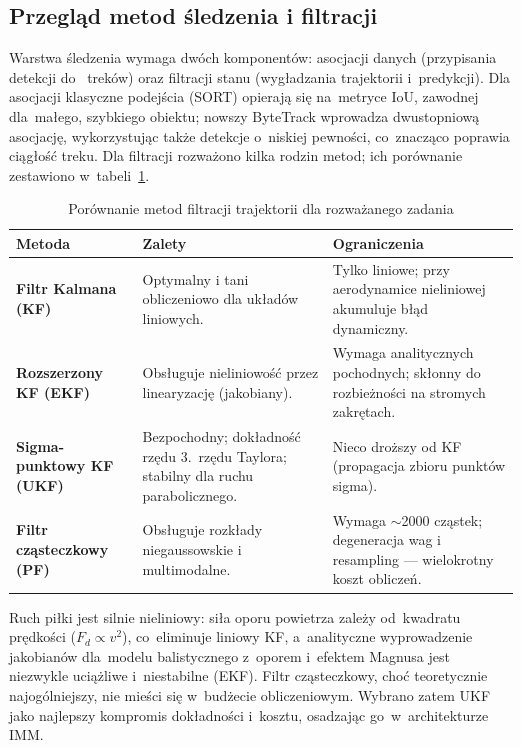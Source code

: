 \documentclass[14pt,a4paper]{extarticle}
\begin{document}
\subsection{Przegląd metod śledzenia i filtracji}
Warstwa śledzenia wymaga dwóch komponentów: asocjacji danych (przypisania detekcji do~
treków) oraz filtracji stanu (wygładzania trajektorii i~predykcji). Dla asocjacji klasyczne
podejścia (SORT) opierają się na~metryce IoU, zawodnej dla~małego, szybkiego obiektu;
nowszy ByteTrack wprowadza dwustopniową asocjację, wykorzystując także detekcje o~niskiej
pewności, co~znacząco poprawia ciągłość treku. Dla filtracji rozważono kilka rodzin metod;
ich porównanie zestawiono w~tabeli~\ref{tab:filtry}.

\begin{table}[H]
\centering
\caption{Porównanie metod filtracji trajektorii dla rozważanego zadania}
\label{tab:filtry}
\renewcommand{\arraystretch}{1.3}
\footnotesize
\begin{tabularx}{\textwidth}{>{\bfseries}p{2.6cm} X X}
\toprule
\rowcolor{vbHead}\textbf{Metoda} & \textbf{Zalety} & \textbf{Ograniczenia} \\
\midrule
Filtr Kalmana (KF) & Optymalny i tani obliczeniowo dla układów liniowych. &
  Tylko liniowe; przy aerodynamice nieliniowej akumuluje błąd dynamiczny. \\
Rozszerzony KF (EKF) & Obsługuje nieliniowość przez linearyzację (jakobiany). &
  Wymaga analitycznych pochodnych; skłonny do rozbieżności na stromych zakrętach. \\
Sigma-punktowy KF (UKF) & Bezpochodny; dokładność rzędu 3.~rzędu Taylora; stabilny dla ruchu parabolicznego. &
  Nieco droższy od KF (propagacja zbioru punktów sigma). \\
Filtr cząsteczkowy (PF) & Obsługuje rozkłady niegaussowskie i multimodalne. &
  Wymaga $\sim$2000 cząstek; degeneracja wag i resampling — wielokrotny koszt obliczeń. \\
\bottomrule
\end{tabularx}
\end{table}

\noindent Ruch piłki jest silnie nieliniowy: siła oporu powietrza zależy od~kwadratu
prędkości ($F_d \propto v^2$), co~eliminuje liniowy KF, a~analityczne wyprowadzenie
jakobianów dla~modelu balistycznego z~oporem i~efektem Magnusa jest niezwykle uciążliwe
i~niestabilne (EKF). Filtr cząsteczkowy, choć teoretycznie najogólniejszy, nie mieści się
w~budżecie obliczeniowym. Wybrano zatem UKF jako najlepszy kompromis dokładności
i~kosztu, osadzając go~w~architekturze IMM.
\end{document}
